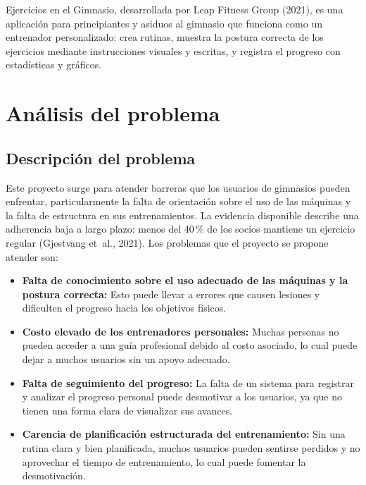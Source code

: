 Ejercicios en el Gimnasio, desarrollada por Leap Fitness Group (2021), es una
aplicación para principiantes y asiduos al gimnasio que funciona como un
entrenador personalizado: crea rutinas, muestra la postura correcta de los
ejercicios mediante instrucciones visuales y escritas, y registra el progreso
con estadísticas y gráficos.

\section{Análisis del problema}
\label{sec:problema}

\subsection{Descripción del problema}

Este proyecto surge para atender barreras que los usuarios de gimnasios pueden
enfrentar, particularmente la falta de orientación sobre el uso de las máquinas
y la falta de estructura en sus entrenamientos. La evidencia disponible
describe una adherencia baja a largo plazo: menos del 40\,\% de los socios
mantiene un ejercicio regular (Gjestvang et~al., 2021). Los problemas que el
proyecto se propone atender son:

\begin{itemize}
    \item \textbf{Falta de conocimiento sobre el uso adecuado de las máquinas y
    la postura correcta:} Esto puede llevar a errores que causen lesiones y
    dificulten el progreso hacia los objetivos físicos.
    \item \textbf{Costo elevado de los entrenadores personales:} Muchas personas
    no pueden acceder a una guía profesional debido al costo asociado, lo cual
    puede dejar a muchos usuarios sin un apoyo adecuado.
    \item \textbf{Falta de seguimiento del progreso:} La falta de un sistema para
    registrar y analizar el progreso personal puede desmotivar a los usuarios,
    ya que no tienen una forma clara de visualizar sus avances.
    \item \textbf{Carencia de planificación estructurada del entrenamiento:} Sin
    una rutina clara y bien planificada, muchos usuarios pueden sentirse
    perdidos y no aprovechar el tiempo de entrenamiento, lo cual puede fomentar
    la desmotivación.
\end{itemize}

